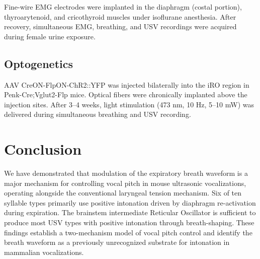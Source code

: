 \documentclass[11pt]{article}
\begin{document}
Fine-wire EMG electrodes were implanted in the diaphragm (costal portion), thyroarytenoid, and cricothyroid muscles under isoflurane anesthesia. After recovery, simultaneous EMG, breathing, and USV recordings were acquired during female urine exposure.

\subsection{Optogenetics}

AAV CreON-FlpON-ChR2::YFP was injected bilaterally into the iRO region in Penk-Cre;Vglut2-Flp mice. Optical fibers were chronically implanted above the injection sites. After 3--4 weeks, light stimulation (473 nm, 10 Hz, 5--10 mW) was delivered during simultaneous breathing and USV recording.

\section{Conclusion}

We have demonstrated that modulation of the expiratory breath waveform is a major mechanism for controlling vocal pitch in mouse ultrasonic vocalizations, operating alongside the conventional laryngeal tension mechanism. Six of ten syllable types primarily use positive intonation driven by diaphragm re-activation during expiration. The brainstem intermediate Reticular Oscillator is sufficient to produce most USV types with positive intonation through breath-shaping. These findings establish a two-mechanism model of vocal pitch control and identify the breath waveform as a previously unrecognized substrate for intonation in mammalian vocalizations.



\end{document}
